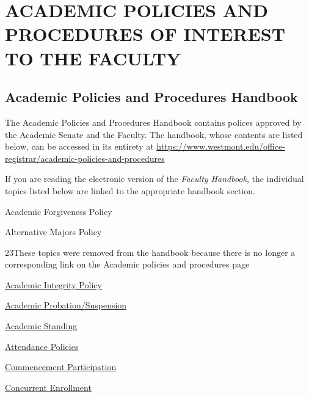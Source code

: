 
\section{ACADEMIC POLICIES AND PROCEDURES OF INTEREST TO THE FACULTY}
	\subsection{Academic Policies and Procedures Handbook}

		The Academic Policies and Procedures Handbook contains polices approved by
		the Academic Senate and the Faculty.  The handbook, whose contents are listed
		below, can be accessed in its entirety at
		\href{
			https://www.westmont.edu/office-registrar/academic-policies-and-procedures
		}{
			\url{https://www.westmont.edu/office-registrar/academic-policies-and-procedures}
		}

		If you are reading the electronic version of the \emph{Faculty Handbook}, the individual topics listed below are linked to the appropriate handbook section.
		\change
		{
			Academic Forgiveness Policy

			Alternative Majors Policy

		}
		{23}{These topics were removed from the handbook because there is no longer a corresponding link on the Academic policies and procedures page}


		\href{https://www.westmont.edu/office-provost/academic-program/academic-integrity-policy} {Academic Integrity Policy}

		\href{https://www.westmont.edu/office-registrar/academic-policies-and-procedures/academic-probationsuspension} {Academic Probation/Suspension}

		\href{https://www.westmont.edu/office-registrar/academic-policies-and-procedures/academic-standing} {Academic Standing}

		\href{https://www.westmont.edu/office-registrar/academic-policies-and-procedures/attendance-policies} {Attendance Policies}

		\href{https://www.westmont.edu/office-registrar/academic-policies-and-procedures/commencement-participation} {Commencement Participation}

		\href{https://www.westmont.edu/office-registrar/academic-policies-and-procedures/concurrent-enrollment} {Concurrent Enrollment}


